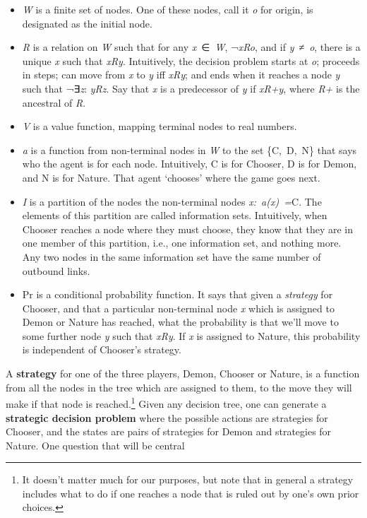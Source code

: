 \documentclass[
  10pt,
  letterpaper,
  DIV=11,
  numbers=noendperiod,
  twoside]{scrartcl}
\providecommand{\tightlist}{%
  \setlength{\itemsep}{0pt}\setlength{\parskip}{0pt}}\usepackage{longtable,booktabs,array}
\begin{document}
\begin{itemize}
\tightlist
\item
  \emph{W} is a finite set of nodes. One of these nodes, call it
  \emph{o} for origin, is designated as the initial node.
\item
  \emph{R} is a relation on \emph{W} such that for any
  \emph{x}~∈~\emph{W}, ¬\emph{xRo}, and if \emph{y}~≠~\emph{o}, there is
  a unique \emph{x} such that \emph{xRy}. Intuitively, the decision
  problem starts at \emph{o}; proceeds in steps; can move from \emph{x}
  to \emph{y} iff \emph{xRy}; and ends when it reaches a node \emph{y}
  such that ¬∃\emph{z}: \emph{yRz}. Say that \emph{x} is a predecessor
  of \emph{y} if \emph{xR+y}, where \emph{R+} is the ancestral of
  \emph{R}.
\item
  \emph{V} is a value function, mapping terminal nodes to real numbers.
\item
  \emph{a} is a function from non-terminal nodes in \emph{W} to the set
  \{C,~D,~N\} that says who the agent is for each node. Intuitively, C
  is for Chooser, D is for Demon, and N is for Nature. That agent
  `chooses' where the game goes next.
\item
  \emph{I} is a partition of the nodes the non-terminal nodes
  \emph{x:~a(x)~=}C. The elements of this partition are called
  information sets. Intuitively, when Chooser reaches a node where they
  must choose, they know that they are in one member of this partition,
  i.e., one information set, and nothing more. Any two nodes in the same
  information set have the same number of outbound links.
\item
  Pr is a conditional probability function. It says that given a
  \emph{strategy} for Chooser, and that a particular non-terminal node
  \emph{x} which is assigned to Demon or Nature has reached, what the
  probability is that we'll move to some further node \emph{y} such that
  \emph{xRy}. If \emph{x} is assigned to Nature, this probability is
  independent of Chooser's strategy.
\end{itemize}

A \textbf{strategy} for one of the three players, Demon, Chooser or
Nature, is a function from all the nodes in the tree which are assigned
to them, to the move they will make if that node is reached.\footnote{It
  doesn't matter much for our purposes, but note that in general a
  strategy includes what to do if one reaches a node that is ruled out
  by one's own prior choices.} Given any decision tree, one can generate
a \textbf{strategic decision problem} where the possible actions are
strategies for Chooser, and the states are pairs of strategies for Demon
and strategies for Nature. One question that will be central
\end{document}
